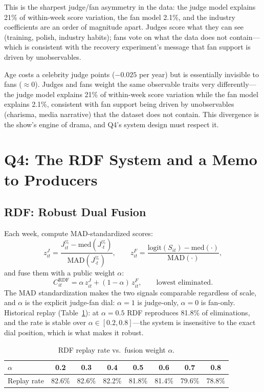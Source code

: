 \documentclass[12pt]{article}
\begin{document}
This is the sharpest judge/fan asymmetry in the data: the judge model explains 21\%
of within-week score variation, the fan model 2.1\%, and the industry coefficients
are an order of magnitude apart. Judges score what they can see (training, polish,
industry habits); fans vote on what the data does not contain---which is consistent
with the recovery experiment's message that fan support is driven by unobservables.

Age costs a celebrity judge points ($-0.025$ per year) but is essentially invisible
to fans (${\approx}0$). Judges and fans weight the same observable traits very
differently---the judge model explains 21\% of within-week score variation while
the fan model explains 2.1\%, consistent with fan support being driven by
unobservables (charisma, media narrative) that the dataset does not contain. This
divergence is the show's engine of drama, and Q4's system design must respect it.

\section{Q4: The RDF System and a Memo to Producers}
\label{sec:q4}

\subsection{RDF: Robust Dual Fusion}
Each week, compute MAD-standardized scores:
\begin{equation}
z^{J}_{it} = \frac{J^\%_{it} - \mathrm{med}(J^\%_{\cdot t})}
{\mathrm{MAD}(J^\%_{\cdot t})}, \qquad
z^{F}_{it} = \frac{\mathrm{logit}(S_{it}) - \mathrm{med}(\cdot)}{\mathrm{MAD}(\cdot)},
\end{equation}
and fuse them with a public weight $\alpha$:
\begin{equation}
C^{\mathrm{RDF}}_{it} = \alpha\, z^{J}_{it} + (1-\alpha)\, z^{F}_{it},
\qquad \text{lowest eliminated.}
\end{equation}
The MAD standardization makes the two signals comparable regardless of scale, and
$\alpha$ is the explicit judge-fan dial: $\alpha{=}1$ is judge-only, $\alpha{=}0$ is
fan-only. Historical replay (Table~\ref{tab:rdf}): at $\alpha{=}0.5$ RDF reproduces
81.8\% of eliminations, and the rate is stable over $\alpha \in [0.2,0.8]$---the
system is insensitive to the exact dial position, which is what makes it robust.

\begin{table}[h]
\centering
\begin{tabular}{lccccccc}
\toprule
$\alpha$ & 0.2 & 0.3 & 0.4 & 0.5 & 0.6 & 0.7 & 0.8 \\
\midrule
Replay rate & 82.6\% & 82.6\% & 82.2\% & 81.8\% & 81.4\% & 79.6\% & 78.8\% \\
\bottomrule
\end{tabular}
\caption{RDF replay rate vs.\ fusion weight $\alpha$.}
\label{tab:rdf}
\end{table}
\end{document}
